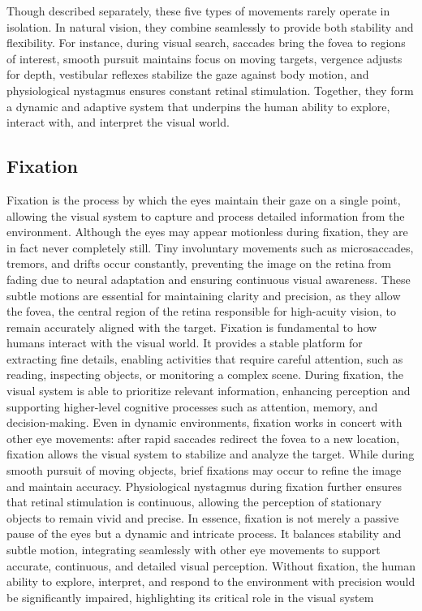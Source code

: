 \documentclass[12pt]{report}
\begin{document}
Though described separately, these five types of movements rarely operate in isolation. 
In natural vision, they combine seamlessly to provide both stability and flexibility.
For instance, during visual search, saccades bring the fovea to regions of interest, smooth pursuit maintains focus on moving targets, vergence adjusts for depth, vestibular reflexes stabilize the gaze against body motion, and physiological nystagmus ensures constant retinal stimulation.
Together, they form a dynamic and adaptive system that underpins the human ability to explore, interact with, and interpret the visual world.

\subsection{Fixation}

Fixation is the process by which the eyes maintain their gaze on a single point, allowing the visual system to capture and process detailed information from the environment.
Although the eyes may appear motionless during fixation, they are in fact never completely still.
Tiny involuntary movements such as microsaccades, tremors, and drifts occur constantly, preventing the image on the retina from fading due to neural adaptation and ensuring continuous visual awareness. 
These subtle motions are essential for maintaining clarity and precision, as they allow the fovea, the central region of the retina responsible for high-acuity vision, to remain accurately aligned with the target.
Fixation is fundamental to how humans interact with the visual world.
It provides a stable platform for extracting fine details, enabling activities that require careful attention, such as reading, inspecting objects, or monitoring a complex scene.
During fixation, the visual system is able to prioritize relevant information, enhancing perception and supporting higher-level cognitive processes such as attention, memory, and decision-making.
Even in dynamic environments, fixation works in concert with other eye movements: after rapid saccades redirect the fovea to a new location, fixation allows the visual system to stabilize and analyze the target.
While during smooth pursuit of moving objects, brief fixations may occur to refine the image and maintain accuracy.
Physiological nystagmus during fixation further ensures that retinal stimulation is continuous, allowing the perception of stationary objects to remain vivid and precise.
In essence, fixation is not merely a passive pause of the eyes but a dynamic and intricate process.
It balances stability and subtle motion, integrating seamlessly with other eye movements to support accurate, continuous, and detailed visual perception.
Without fixation, the human ability to explore, interpret, and respond to the environment with precision would be significantly impaired, highlighting its critical role in the visual system
\end{document}

